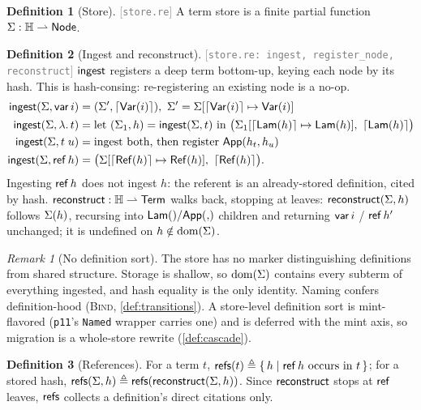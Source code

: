 \documentclass[11pt]{article}
\theoremstyle{definition}
\newtheorem{definition}{Definition}[section]
\theoremstyle{plain}
\theoremstyle{remark}
\newtheorem{remark}{Remark}[section]
\newcommand{\src}[1]{{\footnotesize\textcolor{gray}{[\texttt{#1}]}}}
\begin{document}
\begin{definition}[Store]\label{def:store}
\src{store.re} A term store is a finite partial function $\Sigma : \mathbb{H} \rightharpoonup \mathsf{Node}$.
\end{definition}

\begin{definition}[Ingest and reconstruct]\label{def:ingest}
\src{store.re: ingest, register\_node, reconstruct} $\mathsf{ingest}$ registers a deep term
bottom-up, keying each node by its hash. This is hash-consing: re-registering an existing node
is a no-op.
\begin{align*}
  \ingest(\Store, \Var{i}) &= (\Store', \hashof{\nVar{i}}),\ \Store'=\upd{\Store}{\hashof{\nVar{i}}}{\nVar{i}}\\
  \ingest(\Store, \Lam{t}) &= \text{let } (\Store_1,h)=\ingest(\Store,t) \text{ in } \bigl(\upd{\Store_1}{\hashof{\nLam{h}}}{\nLam{h}},\ \hashof{\nLam{h}}\bigr)\\
  \ingest(\Store, \App{t}{u}) &= \text{ingest both, then register } \nApp{h_t}{h_u}\\
  \ingest(\Store, \tRef{h}) &= \bigl(\upd{\Store}{\hashof{\nRef{h}}}{\nRef{h}},\ \hashof{\nRef{h}}\bigr).
\end{align*}
Ingesting $\mathsf{ref}\,h$ does not ingest $h$: the referent is an already-stored definition, cited
by hash. $\mathsf{reconstruct} : \mathbb{H} \rightharpoonup \mathsf{Term}$ walks back, stopping at leaves:
$\mathsf{reconstruct}(\Sigma,h)$ follows $\Sigma(h)$, recursing into $\nLam{}/\nApp{}$ children and
returning $\mathsf{var}\,i$ / $\mathsf{ref}\,h'$ unchanged; it is undefined on $h \notin \operatorname{dom}(\Sigma)$.
\end{definition}

\begin{remark}[No definition sort]\label{rem:nosort}
The store has no marker distinguishing definitions from shared structure. Storage is shallow,
so $\operatorname{dom}(\Sigma)$ contains every subterm of everything ingested, and hash equality is the only
identity. Naming confers definition-hood (\textsc{Bind}, \cref{def:transitions}). A
store-level definition sort is mint-flavored (\texttt{p11}'s \texttt{Named} wrapper carries
one) and is deferred with the mint axis, so migration is a whole-store rewrite
(\cref{def:cascade}).
\end{remark}

\begin{definition}[References]\label{def:refs}
For a term $t$, $\mathsf{refs}(t) \triangleq \{\, h \mid \mathsf{ref}\,h \text{ occurs in } t\,\}$; for a stored
hash, $\mathsf{refs}(\Sigma,h) \triangleq \mathsf{refs}(\mathsf{reconstruct}(\Sigma,h))$. Since $\mathsf{reconstruct}$ stops at
$\mathsf{ref}\,$ leaves, $\mathsf{refs}$ collects a definition's direct citations only.
\end{definition}
\end{document}
